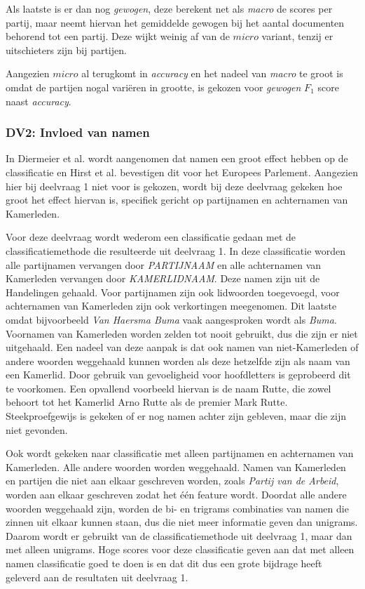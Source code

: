 Als laatste is er dan nog \textit{gewogen}, deze berekent net als \textit{macro} de scores per partij, maar neemt hiervan het gemiddelde gewogen bij het aantal documenten behorend tot een partij. Deze wijkt weinig af van de $micro$ variant, tenzij er uitschieters zijn bij partijen.\par
Aangezien $micro$ al terugkomt in \textit{accuracy} en het nadeel van \textit{macro} te groot is omdat de partijen nogal variëren in grootte, is gekozen voor \textit{gewogen} $F_1$ score naast \textit{accuracy}.
\bigskip

\subsubsection{DV2: Invloed van namen}
In Diermeier et al. \cite{diermeier_godbout_yu_kaufmann_2012} wordt aangenomen dat namen een groot effect hebben op de classificatie en Hirst et al. \cite{Hirst_textto} bevestigen dit voor het Europees Parlement. Aangezien hier bij deelvraag 1 niet voor is gekozen, wordt bij deze deelvraag gekeken hoe groot het effect hiervan is, specifiek gericht op partijnamen en achternamen van Kamerleden. \par
Voor deze deelvraag wordt wederom een classificatie gedaan met de classificatiemethode die resulteerde uit deelvraag 1. In deze classificatie worden alle partijnamen vervangen door \textit{PARTIJNAAM} en alle achternamen van Kamerleden vervangen door \textit{KAMERLIDNAAM}. Deze namen zijn uit de Handelingen gehaald. Voor partijnamen zijn ook lidwoorden toegevoegd, voor achternamen van Kamerleden zijn ook verkortingen meegenomen. Dit laatste omdat bijvoorbeeld \textit{Van Haersma Buma} vaak aangesproken wordt als \textit{Buma}. Voornamen van Kamerleden worden zelden tot nooit gebruikt, dus die zijn er niet uitgehaald. Een nadeel van deze aanpak is dat ook namen van niet-Kamerleden of andere woorden weggehaald kunnen worden als deze hetzelfde zijn als naam van een Kamerlid. Door gebruik van gevoeligheid voor hoofdletters is geprobeerd dit te voorkomen. Een opvallend voorbeeld hiervan is de naam Rutte, die zowel behoort tot het Kamerlid Arno Rutte als de premier Mark Rutte. Steekproefgewijs is gekeken of er nog namen achter zijn gebleven, maar die zijn niet gevonden. \par
Ook wordt gekeken naar classificatie met alleen partijnamen en achternamen van Kamerleden. Alle andere woorden worden weggehaald. Namen van Kamerleden en partijen die niet aan elkaar geschreven worden, zoals \textit{Partij van de Arbeid}, worden aan elkaar geschreven zodat het één feature wordt. Doordat alle andere woorden weggehaald zijn, worden de bi- en trigrams combinaties van namen die zinnen uit elkaar kunnen staan, dus die niet meer informatie geven dan unigrams. Daarom wordt er gebruikt van de classificatiemethode uit deelvraag 1, maar dan met alleen unigrams. Hoge scores voor deze classificatie geven aan dat met alleen namen classificatie goed te doen is en dat dit dus een grote bijdrage heeft geleverd aan de resultaten uit deelvraag 1. \par
